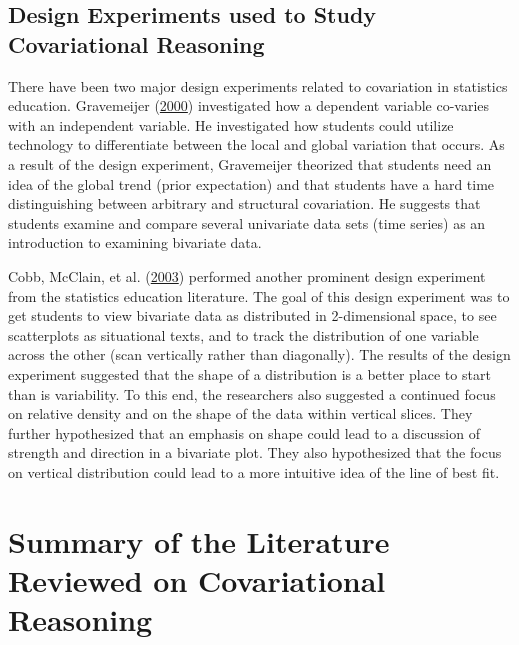 \documentclass[11pt]{umnthesis}
\begin{document}
\hypertarget{design-experiments-used-to-study-covariational-reasoning}{%
\subsection{Design Experiments used to Study Covariational Reasoning}\label{design-experiments-used-to-study-covariational-reasoning}}

There have been two major design experiments related to covariation in statistics education. Gravemeijer (\protect\hyperlink{ref-gravemeijer:2000}{2000}) investigated how a dependent variable co-varies with an independent variable. He investigated how students could utilize technology to differentiate between the local and global variation that occurs. As a result of the design experiment, Gravemeijer theorized that students need an idea of the global trend (prior expectation) and that students have a hard time distinguishing between arbitrary and structural covariation. He suggests that students examine and compare several univariate data sets (time series) as an introduction to examining bivariate data.

Cobb, McClain, et al. (\protect\hyperlink{ref-cobb:2003a}{2003}) performed another prominent design experiment from the statistics education literature. The goal of this design experiment was to get students to view bivariate data as distributed in 2-dimensional space, to see scatterplots as situational texts, and to track the distribution of one variable across the other (scan vertically rather than diagonally). The results of the design experiment suggested that the shape of a distribution is a better place to start than is variability. To this end, the researchers also suggested a continued focus on relative density and on the shape of the data within vertical slices. They further hypothesized that an emphasis on shape could lead to a discussion of strength and direction in a bivariate plot. They also hypothesized that the focus on vertical distribution could lead to a more intuitive idea of the line of best fit.

\hypertarget{summary-of-the-literature-reviewed-on-covariational-reasoning}{%
\section{Summary of the Literature Reviewed on Covariational Reasoning}\label{summary-of-the-literature-reviewed-on-covariational-reasoning}}
\end{document}

